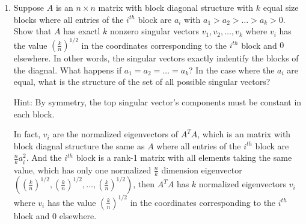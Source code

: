 \documentclass[a4paper, 12pt]{mcshw}
\begin{document}
\begin{enumerate}
    \item Suppose $A$ is an $n \times n$ matrix with block diagonal structure with $k$ equal size blocks where all entries of the $i^{th}$ block are $a_i$ with $a_1 > a_2 > \dots > a_k > 0$. Show that $A$ has exactl $k$ nonzero singular vectors $v_1,v_2,\dots,v_k$ where $v_i$ has the value $(\frac{k}{n})^{1/2}$ in the coordinates corresponding to the $i^{th}$ block and $0$ elsewhere. In other words, the singular vectors exactly indentify the blocks of the diagnal. What happens if $a_1 = a_2 = \dots = a_k$? In the case where the $a_i$ are equal, what is the structure of the set of all possible singular vectors?

        Hint: By symmetry, the top singular vector's components must be constant in each block.
        \begin{solution}
            In fact, $v_i$ are the normalized eigenvectors of $A^TA$, which is an matrix with block diagnal structure the same as $A$ where all entries of the $i^{th}$ block are $\frac{n}{k}a_i^2$. And the $i^{th}$ block is a rank-1 matrix with all elements taking the same value, which has only one normalized $\frac{n}{k}$ dimension eigenvector $\left((\frac{k}{n})^{1/2}, (\frac{k}{n})^{1/2}, \dots, (\frac{k}{n})^{1/2}\right)$, then $A^TA$ has $k$ normalized eigenvectors $v_i$ where $v_i$ has the value $(\frac{k}{n})^{1/2}$ in the coordinates corresponding to the $i^{th}$ block and $0$ elsewhere.


\end{solution}
\end{enumerate}
\end{document}

